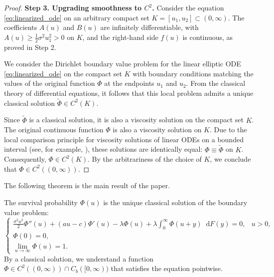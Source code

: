 \documentclass[smallextended]{svjour3}
\providecommand{\diff}{\mathop{}\!\mathrm{d}}
\begin{document}
\begin{proof}
\textbf{Step 3. Upgrading smoothness to $C^2$.} Consider the equation \eqref{eq:linearized_ode} on an arbitrary compact set $K = [u_1, u_2] \subset (0, \infty)$. The coefficients $A(u)$ and $B(u)$ are infinitely differentiable, with $A(u) \ge \frac{1}{2}\sigma^2 u_1^2 > 0$ on $K$, and the right-hand side $f(u)$ is continuous, as proved in Step 2.

We consider the Dirichlet boundary value problem for the linear elliptic ODE \eqref{eq:linearized_ode} on the compact set $K$ with boundary conditions matching the values of the original function $\Phi$ at the endpoints $u_1$ and $u_2$. From the classical theory of differential equations, it follows that this local problem admits a unique classical solution $\tilde{\Phi} \in C^2(K)$.

Since $\tilde{\Phi}$ is a classical solution, it is also a viscosity solution on the compact set $K$. The original continuous function $\Phi$ is also a viscosity solution on $K$. Due to the local comparison principle for viscosity solutions of linear ODEs on a bounded interval (see, for example, \cite{Crandall1992}), these solutions are identically equal: $\Phi \equiv \tilde{\Phi}$ on $K$. Consequently, $\Phi \in C^2(K)$. By the arbitrariness of the choice of $K$, we conclude that $\Phi \in C^2((0, \infty))$.
\end{proof}

The following theorem is the main result of the paper.

\begin{theorem}
The survival probability $\Phi(u)$ is the unique classical solution of the boundary value problem:
\begin{equation*}
\begin{cases}
    \frac{\sigma^2 u^2}{2} \Phi''(u) + (a u - c)\Phi'(u) - \lambda \Phi(u) + \lambda \int_0^\infty \Phi(u+y) \diff F(y) = 0, & u > 0, \\
    \Phi(0) = 0, \\
    \lim_{u \to \infty} \Phi(u) = 1.
\end{cases}
\end{equation*}
By a classical solution, we understand a function $\Phi \in C^2((0, \infty)) \cap C_b([0, \infty))$ that satisfies the equation pointwise.
\end{theorem}
\end{document}
